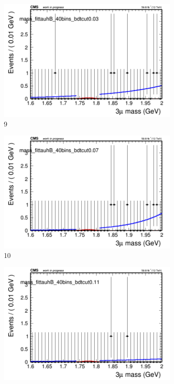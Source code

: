 \begin{figure}[h!]
\begin{subfigure}{0.2\textwidth}
        \includegraphics[width=\textwidth]{unfixed_exp/plots/tauhB/massfit_tauhB_40bins_bdtcut0.03.png}
        \caption{9}
    \end{subfigure}
    \begin{subfigure}{0.2\textwidth}
        \includegraphics[width=\textwidth]{unfixed_exp/plots/tauhB/massfit_tauhB_40bins_bdtcut0.07.png}
        \caption{10}
    \end{subfigure}
    \begin{subfigure}{0.2\textwidth}
        \includegraphics[width=\textwidth]{unfixed_exp/plots/tauhB/massfit_tauhB_40bins_bdtcut0.11.png}

\end{subfigure}
\end{figure}
